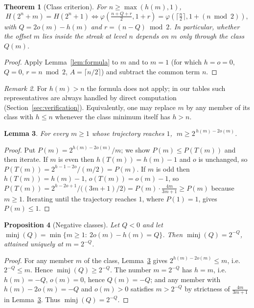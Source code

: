 \documentclass[11pt]{article}
\newtheorem{theorem}{Theorem}
\newtheorem{lemma}[theorem]{Lemma}
\newtheorem{proposition}[theorem]{Proposition}
\theoremstyle{remark}
\newtheorem{remark}[theorem]{Remark}
\newcommand{\TT}{T}
\newcommand{\ooo}{o}
\newcommand{\hh}{h}
\begin{document}
\begin{theorem}[Class criterion]\label{thm:class}
For $n\ge\max(\hh(m),1)$,
\[
H(2^n+m)=H(2^n+1)
\iff
\varphi\!\left(\tfrac{n+Q+r}{2},1+r\right)=\varphi\!\left(\big\lceil\tfrac n2\big\rceil,1+(n\bmod 2)\right),
\]
with $Q=2\ooo(m)-\hh(m)$ and $r=(n-Q)\bmod 2$. In particular, whether the offset $m$ lies inside the
streak at level $n$ depends on $m$ only through the \emph{class} $Q(m)$.
\end{theorem}

\begin{proof}
Apply Lemma~\ref{lem:formula} to $m$ and to $m=1$ (for which $\hh=\ooo=0$, $Q=0$, $r=n\bmod2$,
$A=\lceil n/2\rceil$) and subtract the common term $n$.
\end{proof}

\begin{remark}
For $\hh(m)>n$ the formula does not apply; in our tables such representatives are always handled by
direct computation (Section~\ref{sec:verification}). Equivalently, one may replace $m$ by any member of
its class with $\hh\le n$ whenever the class minimum itself has $\hh>n$.
\end{remark}

\begin{lemma}\label{lem:p}
For every $m\ge1$ whose trajectory reaches $1$, $\;m\ge 2^{\,\hh(m)-2\ooo(m)}$.
\end{lemma}

\begin{proof}
Put $P(m)=2^{\hh(m)-2\ooo(m)}/m$; we show $P(m)\le P(\TT(m))$ and then iterate.
If $m$ is even then $\hh(\TT(m))=\hh(m)-1$ and $\ooo$ is unchanged, so $P(\TT(m))=2^{\hh-1-2\ooo}/(m/2)=P(m)$.
If $m$ is odd then $\hh(\TT(m))=\hh(m)-1$, $\ooo(\TT(m))=\ooo(m)-1$, so
$P(\TT(m))=2^{\hh-2\ooo+1}\big/\big((3m+1)/2\big)=P(m)\cdot\frac{4m}{3m+1}\ge P(m)$
because $m\ge1$. Iterating until the trajectory reaches $1$, where $P(1)=1$, gives $P(m)\le1$.
\end{proof}

\begin{proposition}[Negative classes]\label{prop:neg}
Let $Q<0$ and let $\operatorname{minj}(Q)=\min\{m\ge1:\ 2\ooo(m)-\hh(m)=Q\}$.
Then $\operatorname{minj}(Q)=2^{-Q}$, attained uniquely at $m=2^{-Q}$.
\end{proposition}

\begin{proof}
For any member $m$ of the class, Lemma~\ref{lem:p} gives $2^{\hh(m)-2\ooo(m)}\le m$, i.e.\
$2^{-Q}\le m$. Hence $\operatorname{minj}(Q)\ge2^{-Q}$. The number $m=2^{-Q}$ has
$\hh=m$, i.e.\ $\hh(m)=-Q$, $\ooo(m)=0$, hence $Q(m)=-Q$; and any member with
$\hh(m)-2\ooo(m)=-Q$ and $\ooo(m)>0$ satisfies $m>2^{-Q}$ by strictness of $\frac{4m}{3m+1}$ in
Lemma~\ref{lem:p}. Thus $\operatorname{minj}(Q)=2^{-Q}$.
\end{proof}
\end{document}
